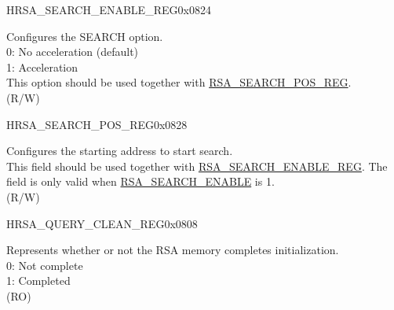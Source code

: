 \begin{register}{H}{RSA\_SEARCH\_ENABLE\_REG}{0x0824}\label{regdesc:RSASEARCHENABLEREG}
%
%
\regnewline%
\begin{regdesc}\begin{reglist}
\label{fielddesc:RSASEARCHENABLE}\item [RSA\_SEARCH\_ENABLE] Configures the SEARCH option. \\
0: No acceleration (default)\\
1: Acceleration\\
This option should be used together with \hyperref[regdesc:RSASEARCHPOSREG]{RSA\_SEARCH\_POS\_REG}. \\
(R/W)
\end{reglist}\end{regdesc}
\end{register}


\begin{register}{H}{RSA\_SEARCH\_POS\_REG}{0x0828}\label{regdesc:RSASEARCHPOSREG}
%
%
\regnewline%
\begin{regdesc}\begin{reglist}
\label{fielddesc:RSASEARCHPOS}\item [RSA\_SEARCH\_POS] Configures the starting address to start search. \\
This field should be used together with \hyperref[regdesc:RSASEARCHENABLEREG]{RSA\_SEARCH\_ENABLE\_REG}. The field is only valid when \hyperref[fielddesc:RSASEARCHENABLE]{RSA\_SEARCH\_ENABLE} is 1. \\
(R/W)
\end{reglist}\end{regdesc}
\end{register}


\begin{register}{H}{RSA\_QUERY\_CLEAN\_REG}{0x0808}\label{regdesc:RSAQUERYCLEANREG}
%
%
\regnewline%
\begin{regdesc}\begin{reglist}
\label{fielddesc:RSAQUERYCLEAN}\item [RSA\_QUERY\_CLEAN] Represents whether or not the RSA memory completes initialization.\\
0: Not complete\\
1: Completed\\ (RO)
\end{reglist}\end{regdesc}
\end{register}


